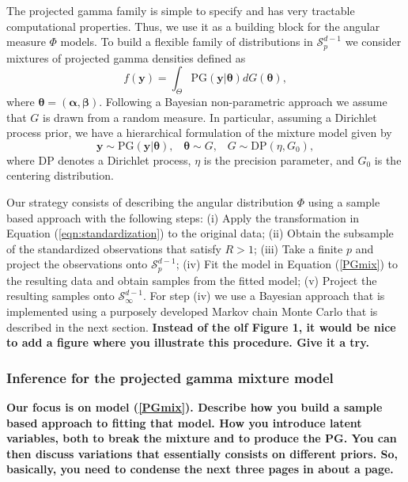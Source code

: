   The projected gamma family is simple to specify and has very tractable computational properties. Thus, we use it as a building block for the angular measure $\Phi$ models. To build a flexible family of distributions in $\mathcal{S}_p^{d-1}$ we consider mixtures of projected gamma densities defined as
  \begin{equation} \label{PGmix}     
     f(\bm{y}) = \int_\Theta \text{PG}(\bm{y}|\bm{\theta}) dG(\bm{\theta}), 
  \end{equation} 
  where $\bm{\theta} = (\bm{\alpha}, \bm{\beta})$. Following a Bayesian non-parametric approach \citep{Ferguson74,Antoniak1974} we assume that $G$ is drawn from a random measure. In particular, assuming a Dirichlet process prior, we have a hierarchical formulation of the mixture model given by
  \[    \bm{y} \sim \text{PG}(\bm{y}|\bm{\theta}) , \;\;\; \bm{\theta} \sim G, \;\;\; G \sim \text{DP}(\eta, G_0),\]
  where DP denotes a Dirichlet process, $\eta$ is the precision parameter, and $G_0$ is the centering distribution. 
  
  Our strategy consists of describing the angular distribution $\Phi$ using a sample based approach with the following steps: (i) Apply the transformation in Equation (\ref{eqn:standardization}) to the original data; (ii) Obtain the subsample of the standardized observations that satisfy $R>1$; (iii) Take a finite $p$ and project the observations onto $\mathcal{S}_p^{d-1}$; (iv) Fit the model in Equation (\ref{PGmix}) to the resulting data and obtain samples from the fitted model; (v) Project the resulting samples onto $\mathcal{S}_\infty^{d-1}$.
  For step (iv) we use a Bayesian approach that is implemented using a purposely developed Markov chain Monte Carlo that is described in the next section. 
  {\bf Instead of the olf Figure 1, it would be nice to add a figure where you illustrate this procedure. Give it a try.}

\subsubsection{Inference for the projected gamma mixture model}
{\bf Our focus is on model (\ref{PGmix}). Describe how you build a sample based approach to fitting that model. How you introduce latent variables, both to break the mixture and to produce the PG. You can then discuss variations that essentially consists on different priors. So, basically, you need to condense the next three pages in about a page.}

